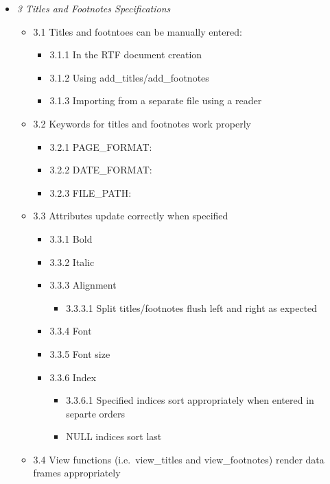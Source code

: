 \documentclass[]{article}
\providecommand{\tightlist}{%
  \setlength{\itemsep}{0pt}\setlength{\parskip}{0pt}}
\begin{document}
\begin{itemize}
\tightlist
\item
  \emph{3 Titles and Footnotes Specifications}

  \begin{itemize}
  \tightlist
  \item
    3.1 Titles and footntoes can be manually entered:

    \begin{itemize}
    \tightlist
    \item
      3.1.1 In the RTF document creation
    \item
      3.1.2 Using add\_titles/add\_footnotes
    \item
      3.1.3 Importing from a separate file using a reader
    \end{itemize}
  \item
    3.2 Keywords for titles and footnotes work properly

    \begin{itemize}
    \tightlist
    \item
      3.2.1 PAGE\_FORMAT:
    \item
      3.2.2 DATE\_FORMAT:
    \item
      3.2.3 FILE\_PATH:
    \end{itemize}
  \item
    3.3 Attributes update correctly when specified

    \begin{itemize}
    \tightlist
    \item
      3.3.1 Bold
    \item
      3.3.2 Italic
    \item
      3.3.3 Alignment

      \begin{itemize}
      \tightlist
      \item
        3.3.3.1 Split titles/footnotes flush left and right as expected
      \end{itemize}
    \item
      3.3.4 Font
    \item
      3.3.5 Font size
    \item
      3.3.6 Index

      \begin{itemize}
      \tightlist
      \item
        3.3.6.1 Specified indices sort appropriately when entered in
        separte orders
      \item
        NULL indices sort last
      \end{itemize}
    \end{itemize}
  \item
    3.4 View functions (i.e.~view\_titles and view\_footnotes) render
    data frames appropriately
  \end{itemize}
\end{itemize}
\end{document}
